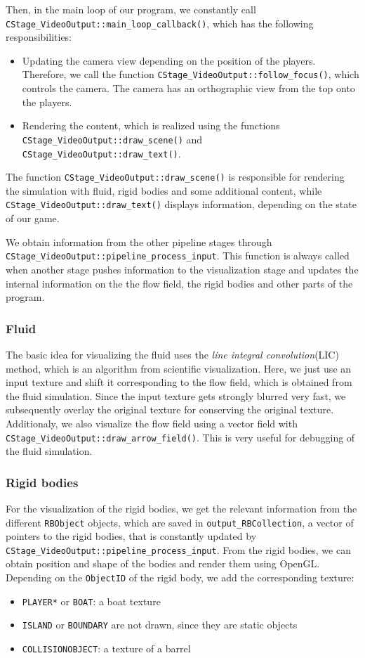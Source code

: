 Then, in the main loop of our program, we constantly call \texttt{CStage_VideoOutput::main_loop_callback()}, which has the following responsibilities:
\begin{itemize}
\item Updating the camera view depending on the position of the players. Therefore, we call the function \texttt{CStage_VideoOutput::follow_focus()}, which controls the camera. The camera has an orthographic view from the top onto the players.
\item Rendering the content, which is realized using the functions \texttt{CStage_VideoOutput::draw_scene()} and \texttt{CStage_VideoOutput::draw_text()}.
\end{itemize}
The function \texttt{CStage_VideoOutput::draw_scene()} is responsible for rendering the simulation with fluid, rigid bodies and some additional content, while \texttt{CStage_VideoOutput::draw_text()} displays information, depending on the state of our game.

We obtain information from the other pipeline stages through \texttt{CStage_VideoOutput::pipeline_process_input}. This function is always called when another stage pushes information to the visualization stage and updates the internal information on the the flow field, the rigid bodies and other parts of the program.

\subsubsection{Fluid}
The basic idea for visualizing the fluid uses the \emph{line integral convolution}(LIC) method, which is an algorithm from scientific visualization. Here, we just use an input texture and shift it corresponding to the flow field, which is obtained from the fluid simulation. Since the input texture gets strongly blurred very fast, we subsequently overlay the original texture for conserving the original texture.
Additionaly, we also visualize the flow field using a vector field with \texttt{CStage_VideoOutput::draw_arrow_field()}. This is very useful for debugging of the fluid simulation.

\subsubsection{Rigid bodies}
For the visualization of the rigid bodies, we get the relevant information from the different \texttt{RBObject} objects, which are saved in \texttt{output_RBCollection}, a vector of pointers to the rigid bodies, that is constantly updated by \texttt{CStage_VideoOutput::pipeline_process_input}. From the rigid bodies, we can obtain position and shape of the bodies and render them using OpenGL. Depending on the \texttt{ObjectID} of the rigid body, we add the corresponding texture:
\begin{itemize}
\item \texttt{PLAYER*} or \texttt{BOAT}: a boat texture
\item \texttt{ISLAND} or \texttt{BOUNDARY} are not drawn, since they are static objects
\item \texttt{COLLISIONOBJECT}: a texture of a barrel
\end{itemize}

